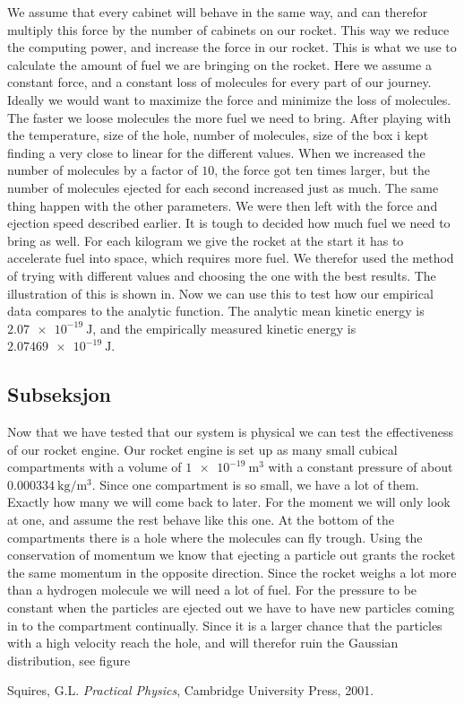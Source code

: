 \documentclass[%
 reprint,
 amsmath,amssymb,
 aps,
]{revtex4-1}
\begin{document}
We assume that every cabinet will behave in the same way, and can therefor multiply this force by the number of cabinets on our rocket. This way we reduce the computing power, and increase the force in our rocket. This is what we use to calculate the amount of fuel we are bringing on the rocket. Here we assume a constant force, and a constant loss of molecules for every part of our journey. Ideally we would want to maximize the force and minimize the loss of molecules. The faster we loose molecules the more fuel we need to bring. After playing with the temperature, size of the hole, number of molecules, size of the box i kept finding a very close to linear for the different values. When we increased the number of molecules by a factor of $10$, the force got ten times larger, but the number of molecules ejected for each second increased just as much. The same thing happen with the other parameters. We were then left with the force and ejection speed described earlier.
It is tough to decided how much fuel we need to bring as well. For each kilogram we give the rocket at the start it has to accelerate fuel into space, which requires more fuel. We therefor used the method of trying with different values and choosing the one with the best results. The illustration of this is shown in.
Now we can use this to test how our empirical data compares to the analytic function. The analytic mean kinetic energy is $\SI{2.07e-19}{\joule}$, and the empirically measured kinetic energy is $\SI{2.07469e-19}{\joule}$.
\subsection{\label{sec:level2}Subseksjon}

Now that we have tested that our system is physical we can test the effectiveness of our rocket engine. Our rocket engine is set up as many small cubical compartments with a volume of $\SI{1e-19}{\meter^3}$ with a constant pressure of about $\SI{0.000334}{\kilogram\per\m^3}$. Since one compartment is so small, we have a lot of them. Exactly how many we will come back to later. For the moment we will only look at one, and assume the rest behave like this one. At the bottom of the compartments there is a hole where the molecules can fly trough. Using the conservation of momentum we know that ejecting a particle out grants the rocket the same momentum in the opposite direction. Since the rocket weighs a lot more than a hydrogen molecule we will need a lot of fuel. For the pressure to be constant when the particles are ejected out we have to have new particles coming in to the compartment continually. Since it is a larger chance that the particles with a high velocity reach the hole, and will therefor ruin the Gaussian distribution, see figure
\begin{thebibliography}{9}


Squires, G.L. \emph{Practical Physics}, Cambridge University Press, 2001.



 \end{thebibliography}
\end{document}
